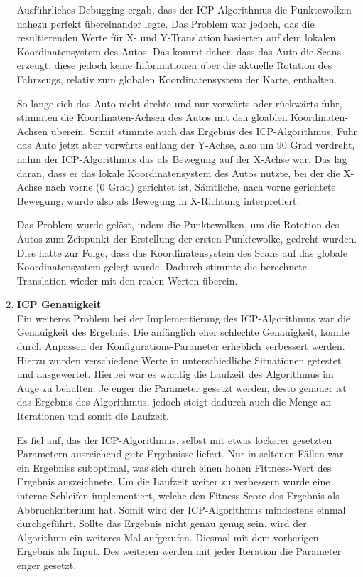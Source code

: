 \begin{enumerate}[leftmargin=*]
    Ausführliches Debugging ergab, dass der ICP-Algorithmus die Punktewolken nahezu perfekt übereinander legte.
    Das Problem war jedoch, das die resultierenden Werte für X- und Y-Translation basierten auf dem lokalen Koordinatensystem des Autos.
    Das kommt daher, dass das Auto die Scans erzeugt, diese jedoch keine Informationen über die aktuelle Rotation des Fahrzeugs, 
    relativ zum globalen Koordinatensystem der Karte, enthalten.
    
    So lange sich das Auto nicht drehte und nur vorwärts oder rückwärts fuhr, stimmten die Koordinaten-Achsen des Autos mit den gloablen Koordinaten-Achsen überein.
    Somit stimmte auch das Ergebnis des ICP-Algorithmus.
    Fuhr das Auto jetzt aber vorwärts entlang der Y-Achse, also um 90 Grad verdreht, nahm der ICP-Algorithmus das als Bewegung auf der X-Achse war.
    Das lag daran, dass er das lokale Koordinatensystem des Autos nutzte, bei der die X-Achse nach vorne (0 Grad) gerichtet ist,
    Sämtliche, nach vorne gerichtete Bewegung, wurde also als Bewegung in X-Richtung interpretiert.

    Das Problem wurde gelöst, indem die Punktewolken, um die Rotation des Autos zum Zeitpunkt der Erstellung der ersten Punktewolke, gedreht wurden.
    Dies hatte zur Folge, dass das Koordinatensystem des Scans auf das globale Koordinatensystem gelegt wurde.
    Dadurch stimmte die berechnete Translation wieder mit den realen Werten überein.

    \item \textbf{ICP Genauigkeit} \\
    Ein weiteres Problem bei der Implementierung des ICP-Algorithmus war die Genauigkeit des Ergebnis.
    Die anfänglich eher schlechte Genauigkeit, konnte durch Anpassen der Konfigurations-Parameter erheblich verbessert werden.
    Hierzu wurden verschiedene Werte in unterschiedliche Situationen getestet und ausgewertet.
    Hierbei war es wichtig die Laufzeit des Algorithmus im Auge zu behalten.
    Je enger die Parameter gesetzt werden, desto genauer ist das Ergebnis des Algorithmus, jedoch steigt dadurch auch die Menge an Iterationen und somit die Laufzeit.

    Es fiel auf, das der ICP-Algorithmus, selbst mit etwas lockerer gesetzten Parametern ausreichend gute Ergebnisse liefert.
    Nur in seltenen Fällen war ein Ergebniss suboptimal, was sich durch einen hohen Fittness-Wert des Ergebnis auszeichnete.
    Um die Laufzeit weiter zu verbessern wurde eine interne Schleifen implementiert, welche den Fitness-Score des Ergebnis als Abbruchkriterium hat.
    Somit wird der ICP-Algorithmus mindestens einmal durchgeführt.
    Sollte das Ergebnis nicht genau genug sein, wird der Algorithmu ein weiteres Mal aufgerufen.
    Diesmal mit dem vorherigen Ergebnis als Input.
    Des weiteren werden mit jeder Iteration die Parameter enger gesetzt.


\end{enumerate}
